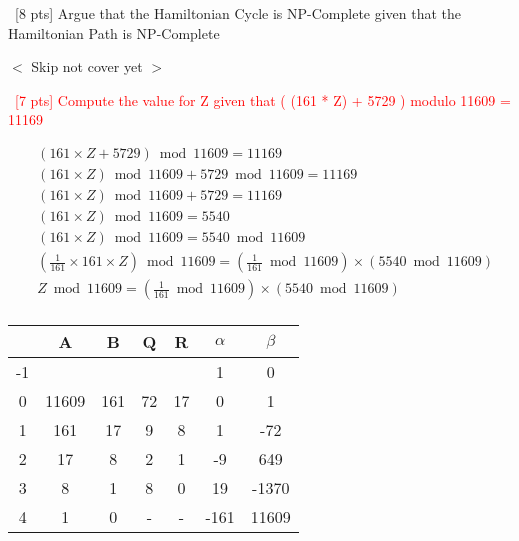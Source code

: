 \documentclass[12pt]{article}
\newenvironment{sol}[1][Solution]{\begin{trivlist}\item[\hskip\labelsep {\bfseries #1:}]}{\end{trivlist}}
\begin{document}
\begin{enumerate}
    \item \ [8 pts] Argue that the Hamiltonian Cycle is NP-Complete given that the Hamiltonian Path is NP-Complete
    \begin{sol}
        $<$ Skip not cover yet $>$
    \end{sol}
    \item \ \textcolor{red}{[7 pts] Compute the value for Z given that ( (161 * Z) + 5729 ) modulo 11609 = 11169}
    \begin{sol}
    \begin{align*}
        & (161 \times Z + 5729) \bmod 11609 = 11169 \\
        & (161 \times Z) \bmod 11609 + 5729 \bmod 11609 = 11169 \\
        & (161 \times Z) \bmod 11609 + 5729 = 11169 \\
        & (161 \times Z) \bmod 11609 = 5540 \\ 
        & (161 \times Z) \bmod 11609 = 5540 \bmod 11609 \\ 
        & (\frac{1}{161}\times 161 \times Z) \bmod 11609 = (\frac{1}{161} \bmod 11609) \times (5540 \bmod 11609)\\
        & Z \bmod 11609 = (\frac{1}{161} \bmod 11609) \times (5540 \bmod 11609) \\
    \end{align*}
    \begin{center}
        \begin{tabular}{|c|c|c|c|c|c|c|}
        \hline
             & A & B & Q & R & $\alpha$ & $\beta$   \\
             \hline
        -1   &   &   &   &   &      1    &  0 \\
        \hline
        0    & 11609  &  161  & 72   & 17   &      0    &  1 \\
        \hline
        1    & 161   &  17  & 9 & 8 & 1 & -72 \\
        \hline
        2 & 17 & 8 & 2  & 1 & -9 & 649 \\
        \hline
        3 & 8 & 1 & 8 & 0 & 19 & -1370 \\
        \hline
        4 & 1 & 0 & - & - & -161 & 11609 \\
        

\end{tabular}
\end{center}
\end{sol}
\end{enumerate}
\end{document}
